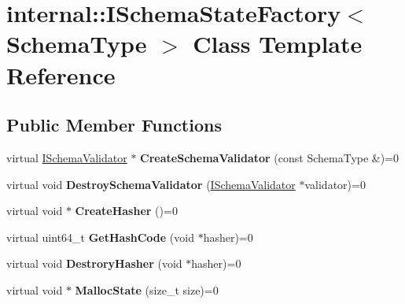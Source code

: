 \hypertarget{classinternal_1_1_i_schema_state_factory}{}\section{internal\+:\+:I\+Schema\+State\+Factory$<$ Schema\+Type $>$ Class Template Reference}
\label{classinternal_1_1_i_schema_state_factory}
\subsection*{Public Member Functions}
\begin{DoxyCompactItemize}
\item 
virtual \hyperlink{classinternal_1_1_i_schema_validator}{I\+Schema\+Validator} $\ast$ {\bfseries Create\+Schema\+Validator} (const Schema\+Type \&)=0\hypertarget{classinternal_1_1_i_schema_state_factory_ae8c98fcff6a057b4fcd9018fc14551a8}{}\label{classinternal_1_1_i_schema_state_factory_ae8c98fcff6a057b4fcd9018fc14551a8}

\item 
virtual void {\bfseries Destroy\+Schema\+Validator} (\hyperlink{classinternal_1_1_i_schema_validator}{I\+Schema\+Validator} $\ast$validator)=0\hypertarget{classinternal_1_1_i_schema_state_factory_a112cbf154077050bc30ffe670032442c}{}\label{classinternal_1_1_i_schema_state_factory_a112cbf154077050bc30ffe670032442c}

\item 
virtual void $\ast$ {\bfseries Create\+Hasher} ()=0\hypertarget{classinternal_1_1_i_schema_state_factory_a4ac37b9d3e9526004c82692473f978f4}{}\label{classinternal_1_1_i_schema_state_factory_a4ac37b9d3e9526004c82692473f978f4}

\item 
virtual uint64\+\_\+t {\bfseries Get\+Hash\+Code} (void $\ast$hasher)=0\hypertarget{classinternal_1_1_i_schema_state_factory_addfcf00963cc777edf642b204f07c8d6}{}\label{classinternal_1_1_i_schema_state_factory_addfcf00963cc777edf642b204f07c8d6}

\item 
virtual void {\bfseries Destrory\+Hasher} (void $\ast$hasher)=0\hypertarget{classinternal_1_1_i_schema_state_factory_a70b8d88180d2e6993105b17f19101635}{}\label{classinternal_1_1_i_schema_state_factory_a70b8d88180d2e6993105b17f19101635}

\item 
virtual void $\ast$ {\bfseries Malloc\+State} (size\+\_\+t size)=0\hypertarget{classinternal_1_1_i_schema_state_factory_ada92ebf8e9ef994f7e20a0f7f9750519}{}\label{classinternal_1_1_i_schema_state_factory_ada92ebf8e9ef994f7e20a0f7f9750519}


\end{DoxyCompactItemize}
